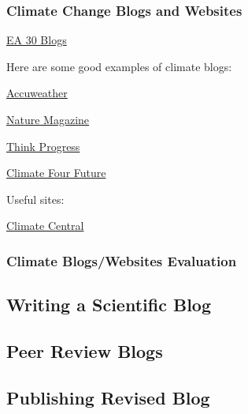 \documentclass{article}\usepackage[]{graphicx}\usepackage[]{color}
\newenvironment{itemize*}%
  {\begin{itemize}%
    \setlength{\itemsep}{0pt}%
    \setlength{\parskip}{0pt}}%
  {\end{itemize}}
\begin{document}
\subsubsection{Climate Change Blogs and Websites}

\href{https://marclos.github.io/Climate_Change_Narratives/}{EA 30 Blogs}

Here are some good examples of climate blogs:

\begin{itemize*}
  \item \href{http://www.accuweather.com/en/weather-blogs/climatechange}{Accuweather}
  \item \href{http://blogs.nature.com/climatefeedback/}{Nature Magazine}
  \item \href{https://thinkprogress.org/tagged/climate}{Think Progress}
  \item \href{http://climateofourfuture.org/}{Climate Four Future}
\end{itemize*}

Useful sites: 

\begin{itemize*}
  \item \href{http://www.climatecentral.org/news/the-heat-is-on}{Climate Central}
  \item 
\end{itemize*}

\subsubsection{Climate Blogs/Websites Evaluation}



\subsection{Writing a Scientific Blog}



\subsection{Peer Review Blogs}



\subsection{Publishing Revised Blog}
\end{document}
